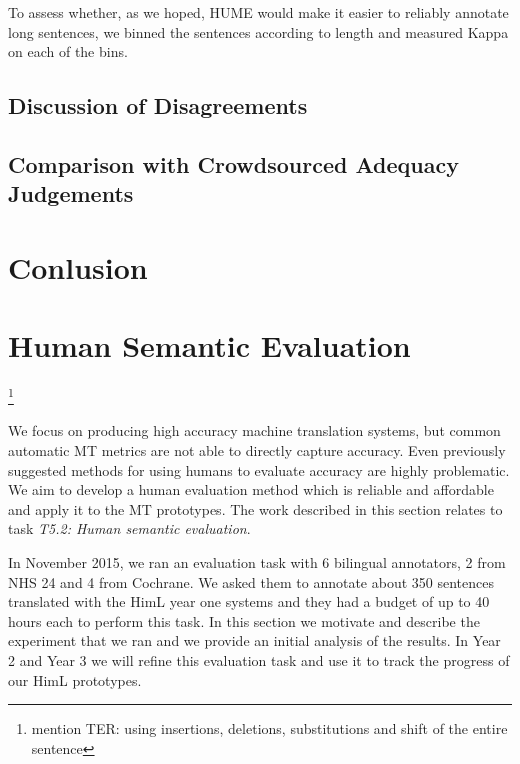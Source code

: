 \documentclass[11pt]{article}
\newcommand{\oa}[1]{\footnote{\color{red} #1}}
\begin{document}
To assess whether, as we hoped, HUME would make it easier to reliably annotate long sentences,
we binned the sentences according to length and measured Kappa on each of the bins.


\subsection{Discussion of Disagreements}\label{sec:disagreements}


\subsection{Comparison with Crowdsourced Adequacy Judgements}\label{sec:adequacy}



\section{Conlusion}\label{sec:conclusion}










\section{Human Semantic Evaluation}

\oa{mention TER: using insertions, deletions, substitutions and shift of the entire sentence}

\label{sec:sem-eval:human}
We focus on producing high accuracy machine translation systems, but common 
automatic MT metrics are not able to directly capture accuracy. Even previously suggested methods
for using humans to evaluate accuracy are highly problematic. We aim to  develop a human evaluation method 
which is reliable and affordable and apply it to the MT prototypes. 
The
work described
in this section relates to 
task
\emph{T5.2: Human semantic evaluation}.


In November 2015, we ran an evaluation task with 6 bilingual annotators, 2 from NHS 24 and 4 from Cochrane. 
We asked them to annotate about 350 sentences translated with the HimL year one systems 
and they had a budget of  up  to 40 hours each to perform this task. 
In this section we motivate and describe the experiment that we ran and we provide an initial analysis of
the results. In  Year 2 and Year 3 we will refine this evaluation task and use it to track the progress of our HimL prototypes.
\end{document}
